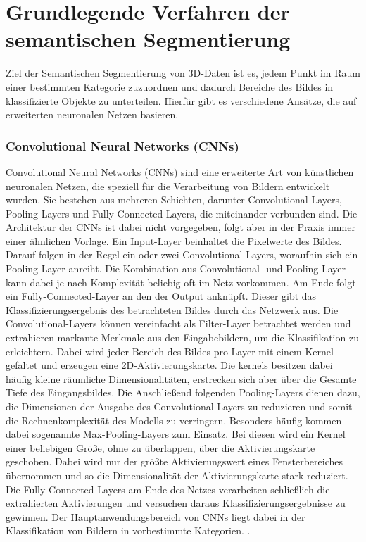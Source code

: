 \chapter{Grundlegende Verfahren der semantischen Segmentierung}

Ziel der Semantischen Segmentierung von 3D-Daten ist es, jedem Punkt im Raum
einer bestimmten Kategorie zuzuordnen und dadurch Bereiche des Bildes in
klassifizierte Objekte zu unterteilen. Hierfür gibt es verschiedene Ansätze,
die auf erweiterten neuronalen Netzen basieren.

\subsection{Convolutional Neural Networks (CNNs)}
Convolutional Neural Networks (CNNs) sind eine erweiterte Art von künstlichen
neuronalen Netzen, die speziell für die Verarbeitung von Bildern entwickelt
wurden. Sie bestehen aus mehreren Schichten, darunter Convolutional Layers,
Pooling Layers und Fully Connected Layers, die miteinander verbunden sind. Die
Architektur der CNNs ist dabei nicht vorgegeben, folgt aber in der Praxis immer
einer ähnlichen Vorlage. Ein Input-Layer beinhaltet die Pixelwerte des Bildes.
Darauf folgen in der Regel ein oder zwei Convolutional-Layers, woraufhin sich
ein Pooling-Layer anreiht. Die Kombination aus Convolutional- und Pooling-Layer
kann dabei je nach Komplexität beliebig oft im Netz vorkommen. Am Ende folgt
ein Fully-Connected-Layer an den der Output anknüpft. Dieser gibt das
Klassifizierungsergebnis des betrachteten Bildes durch das Netzwerk aus. Die
Convolutional-Layers können vereinfacht als Filter-Layer betrachtet werden und
extrahieren markante Merkmale aus den Eingabebildern, um die Klassifikation zu
erleichtern. Dabei wird jeder Bereich des Bildes pro Layer mit einem Kernel
gefaltet und erzeugen eine 2D-Aktivierungskarte. Die kernels besitzen dabei
häufig kleine räumliche Dimensionalitäten, erstrecken sich aber über die
Gesamte Tiefe des Eingangsbildes. Die Anschließend folgenden Pooling-Layers
dienen dazu, die Dimensionen der Ausgabe des Convolutional-Layers zu reduzieren
und somit die Rechnenkomplexität des Modells zu verringern. Besonders häufig
kommen dabei sogenannte Max-Pooling-Layers zum Einsatz. Bei diesen wird ein
Kernel einer beliebigen Größe, ohne zu überlappen, über die Aktivierungskarte
geschoben. Dabei wird nur der größte Aktivierungswert eines Fensterbereiches
übernommen und so die Dimensionalität der Aktivierungskarte stark reduziert.
Die Fully Connected Layers am Ende des Netzes verarbeiten schließlich die
extrahierten Aktivierungen und versuchen daraus Klassifizierungsergebnisse zu
gewinnen. Der Hauptanwendungsbereich von CNNs liegt dabei in der Klassifikation
von Bildern in vorbestimmte Kategorien. \cite{11262015}.

